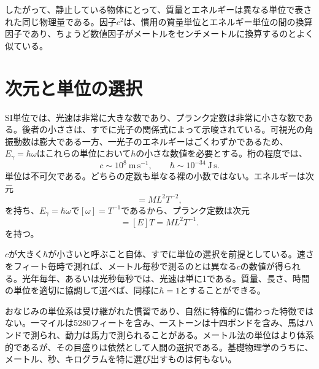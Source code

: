 したがって、静止している物体にとって、質量とエネルギーは異なる単位で表された同じ物理量である。因子\(c^2\)は、慣用の質量単位とエネルギー単位の間の換算因子であり、ちょうど数値因子がメートルをセンチメートルに換算するのとよく似ている。

\begin{classroomqa}
\end{classroomqa}

\section{次元と単位の選択}

SI単位では、光速は非常に大きな数であり、プランク定数は非常に小さな数である。後者の小ささは、すでに光子の関係式によって示唆されている。可視光の角振動数は膨大である一方、一光子のエネルギーはごくわずかであるため、\(E_\gamma=\hbar\omega\)はこれらの単位において\(\hbar\)の小さな数値を必要とする。桁の程度では、
\begin{equation}
c\sim 10^8\ \mathrm{m\,s^{-1}},
\qquad
\hbar\sim 10^{-34}\ \mathrm{J\,s}.
\end{equation}
単位は不可欠である。どちらの定数も単なる裸の小数ではない。エネルギーは次元
\begin{equation}
[E]=M L^2 T^{-2},
\end{equation}
を持ち、\(E_\gamma=\hbar\omega\)で\([\omega]=T^{-1}\)であるから、プランク定数は次元
\begin{equation}
[\hbar]=[E]T=M L^2 T^{-1}.
\end{equation}
を持つ。

\(c\)が大きく\(\hbar\)が小さいと呼ぶこと自体、すでに単位の選択を前提としている。速さをフィート毎時で測れば、メートル毎秒で測るのとは異なる\(c\)の数値が得られる。光年毎年、あるいは光秒毎秒では、光速は単に1である。質量、長さ、時間の単位を適切に協調して選べば、同様に\(\hbar=1\)とすることができる。

おなじみの単位系は受け継がれた慣習であり、自然に特権的に備わった特徴ではない。一マイルは5280フィートを含み、一ストーンは十四ポンドを含み、馬はハンドで測られ、動力は馬力で測られることがある。メートル法の単位はより体系的であるが、その目盛りは依然として人間の選択である。基礎物理学のうちに、メートル、秒、キログラムを特に選び出すものは何もない。

